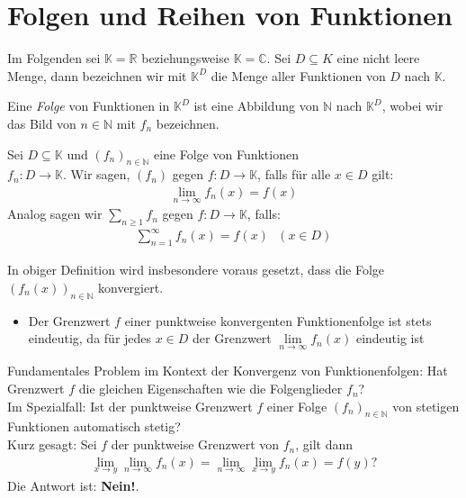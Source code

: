 \cleardoublepage
\section{Folgen und Reihen von Funktionen}
Im Folgenden sei $\mathbb{K} = \mathbb{R}$ beziehungsweise $\mathbb{K} = \mathbb{C}$. Sei $D \subseteq K$ eine nicht leere Menge, dann bezeichnen wir mit $\mathbb{K}^D $ die Menge aller Funktionen von $D$ nach $\mathbb{K}$.

Eine \emph{Folge} von Funktionen in $\mathbb{K}^D$ ist eine Abbildung von $\mathbb{N}$ nach $\mathbb{K}^D$, wobei wir das Bild von $n \in \mathbb{N}$ mit 
$f_n$ bezeichnen.

\begin{Definition}{
	Sei $D \subseteq \mathbb{K}$ und $(f_n)_{n \in \mathbb{N}}$ eine Folge von 
	Funktionen \\ $f_n : D \rightarrow \mathbb{K}$. Wir sagen, $(f_n)$  gegen $f:D \rightarrow \mathbb{K}$, falls für alle $x \in D$ gilt:
	\begin{align*}
		\lim \limits_{n \rightarrow \infty}{f_n(x) =f(x)}
	\end{align*}
	Analog sagen wir $\sum_{n\geq 1} f_n$  gegen 
	$f: D \rightarrow \mathbb{K}$, falls:
	\begin{align*}
		\sum_{n = 1}^{\infty} f_n(x) = f(x) \text{ } (x \in D)
	\end{align*}
}\end{Definition}

\begin{Bemerkung}{
	In obiger Definition wird insbesondere voraus gesetzt, dass die Folge $(f_n(x))_
	{n \in \mathbb{N}}$ konvergiert.
	\begin{itemize}
		\item Der Grenzwert $f$ einer punktweise konvergenten Funktionenfolge ist 
		stets eindeutig, da für jedes $x \in D$ der Grenzwert 
		$\lim\limits_{n \rightarrow \infty} f_n(x)$ eindeutig ist
	\end{itemize}
	Fundamentales Problem im Kontext der Konvergenz von Funktionenfolgen:
	\glqq Hat Grenzwert $f$ die \glqq gleichen\grqq{} Eigenschaften wie die 
	Folgenglieder $f_n$?\grqq{} \\
	Im Spezialfall: Ist der punktweise Grenzwert $f$ einer Folge $(f_n)_{n \in 
	\mathbb{N}}$ von stetigen Funktionen automatisch stetig? \\
	Kurz gesagt: Sei $f$ der punktweise Grenzwert von $f_n$, gilt dann 
	\begin{align*}
		\lim\limits_{x \rightarrow y}{\lim \limits_{n \rightarrow \infty}{f_n(x)}}
		= \lim\limits_{n \rightarrow \infty}{\lim\limits_{x \rightarrow y}{f_n(x)} }
		= f(y) ?
	\end{align*}
	Die Antwort ist: \textbf{Nein!}.
}\end{Bemerkung}

